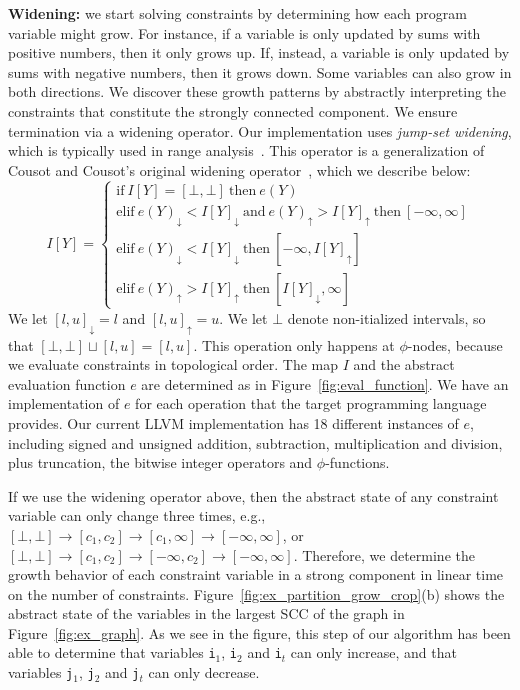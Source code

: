 \documentclass{sigplanconf}[10pt]
\newcommand{\lb}[1]{#1_{\downarrow}}
\newcommand{\ub}[1]{#1_{\uparrow}}
\begin{document}
\noindent
\textbf{Widening: } we start solving constraints by determining how each
program variable might grow.
For instance, if a variable is only updated by sums with positive numbers, then
it only grows up.
If, instead, a variable is only updated by sums with negative numbers, then it
grows down.
Some variables can also grow in both directions.
We discover these growth patterns by abstractly interpreting the constraints
that constitute the strongly connected component.
We ensure termination via a widening operator.
Our implementation uses {\em jump-set widening}, which is typically used in
range analysis~\cite[p.228]{Nielson99}.
This operator is a generalization of Cousot and Cousot's original widening
operator~\cite{Cousot77}, which we describe below:
%
\begin{equation*}
I[Y] =
\begin{cases}
\mbox{if} \ I[Y] = [\bot, \bot] \ \mbox{then} \ e(Y) \\
\mbox{elif} \ \lb{e(Y)} < \lb{I[Y]}  \ \mbox{and} \ \ub{e(Y)} > \ub{I[Y]} \ \mbox{then} \ [-\infty, \infty] \\
\mbox{elif} \ \lb{e(Y)} < \lb{I[Y]} \ \mbox{then} \ [-\infty, \ub{I[Y]}] \\
\mbox{elif} \ \ub{e(Y)} > \ub{I[Y]} \ \mbox{then} \ [\lb{I[Y]}, \infty]
\end{cases}
\end{equation*}
%
We let $\lb{[l, u]} = l$ and $\ub{[l, u]} = u$.
We let $\bot$ denote non-itialized intervals, so that $[\bot, \bot] \sqcup
[l, u] = [l, u]$.
This operation only happens at $\phi$-nodes, because we evaluate constraints in
topological order.
The map $I$ and the abstract evaluation function $e$ are determined as in
Figure~\ref{fig:eval_function}.
We have an implementation of $e$ for each operation that the
target programming language provides.
Our current LLVM implementation has 18 different instances of $e$, including
signed and unsigned addition, subtraction, multiplication and division, plus
truncation, the bitwise integer operators and $\phi$-functions.

If we use the widening operator above, then the abstract state of any constraint
variable can only change three times, e.g., $[\bot, \bot] \rightarrow [c_1, c_2]
\rightarrow [c_1, \infty] \rightarrow [-\infty, \infty]$, or
$[\bot, \bot] \rightarrow [c_1, c_2] \rightarrow [-\infty, c_2]
\rightarrow [-\infty, \infty]$.
Therefore, we determine the growth behavior of each constraint variable in
a strong component in linear time on the number of constraints.
Figure~\ref{fig:ex_partition_grow_crop}(b) shows the abstract state of the
variables in the largest SCC of the graph in Figure~\ref{fig:ex_graph}.
As we see in the figure, this step of our algorithm has been able to determine
that variables \texttt{i}$_1$, \texttt{i}$_2$ and \texttt{i}$_t$ can only
increase, and that variables \texttt{j}$_1$, \texttt{j}$_2$ and \texttt{j}$_t$
can only decrease.
\end{document}
